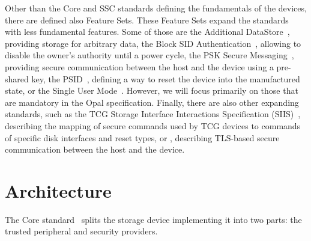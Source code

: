 Other than the Core and SSC standards defining the fundamentals of the devices, there are defined also Feature Sets. These Feature Sets expand the standards with less fundamental features. Some of those are 
the Additional DataStore~\cite{tcg-additional-datastore}, providing storage for arbitrary data,
the Block SID Authentication~\cite{tcg-block-sid-auth}, allowing to disable the owner's authority until a power cycle,
the PSK Secure Messaging~\cite{tcg-psk-secure-messaging}, providing secure communication between the host and the device using a pre-shared key,
the PSID~\cite{tcg-psid}, defining a way to reset the device into the manufactured state,
or the Single User Mode~\cite{tcg-sum}.
However, we will focus primarily on those that are mandatory in the Opal specification.
Finally, there are also other expanding standards, such as the TCG Storage Interface Interactions Specification (SIIS)~\cite{tcg-siis}, describing the mapping of secure commands used by TCG devices to commands of specific disk interfaces and reset types, or \cite{tcg-secure-messaging-addendum}, describing TLS-based secure communication between the host and the device.

\section{Architecture}



    

The Core standard~\cite{tcg-storage-core} splits the storage device implementing it into two parts: the trusted peripheral and security providers.

